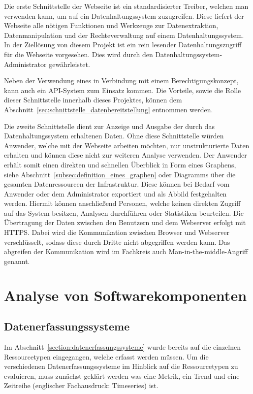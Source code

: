 Die erste Schnittstelle der Webseite ist ein standardisierter \gls{Treiber},
welchen man verwenden kann, um auf ein Datenhaltungssystem zuzugreifen. Diese
liefert der Webseite alle nötigen Funktionen und Werkzeuge zur
Datenextraktion, Datenmanipulation und der Rechteverwaltung auf einem
Datenhaltungssystem. In der Ziellösung von diesem Projekt ist ein rein lesender
Datenhaltungszugriff für die Webseite vorgesehen. Dies wird durch den
Datenhaltungssystem\hyp{}Administrator gewährleistet.

Neben der Verwendung eines  in Verbindung mit einem
Berechtigungskonzept, kann auch ein \gls{API}\hyp{}System zum Einsatz kommen.
Die Vorteile, sowie die Rolle dieser Schnittstelle innerhalb dieses Projektes,
können dem Abschnitt~\ref{sec:schnittstelle_datenbereitstellung} entnommen
werden.

Die zweite Schnittstelle dient zur Anzeige und Ausgabe der durch das
Datenhaltungssystem erhaltenen Daten. Ohne diese Schnittstelle würden Anwender,
welche mit der Webseite arbeiten möchten, nur unstrukturierte Daten
erhalten und können diese nicht zur weiteren Analyse verwenden. Der Anwender
erhält somit einen direkten und schnellen Überblick in Form eines Graphens,
siehe Abschnitt~\ref{subsec:definition_eines_graphen} oder
Diagramms über die gesamten Datenressourcen der Infrastruktur. Diese können bei
Bedarf vom Anwender oder dem Administrator exportiert und als Abbild
festgehalten werden. Hiermit können anschließend Personen, welche keinen
direkten Zugriff auf das System besitzen, Analysen durchführen oder Statistiken
beurteilen. Die Übertragung der Daten zwischen den Benutzern und dem Webserver
erfolgt mit \gls{HTTPS}. Dabei wird die Kommunikation zwischen Browser und
Webserver verschlüsselt, sodass diese durch Dritte nicht abgegriffen werden
kann. Das abgreifen der Kommunikation wird im Fachkreis auch
Man\hyp{}in\hyp{}the\hyp{}middle\hyp{}Angriff genannt.
\mr%

\chapter{Analyse von Softwarekomponenten}
\section{Datenerfassungssysteme}
Im Abschnitt~\ref{section:datenerfassungssysteme} wurde bereits auf die
einzelnen Ressourcetypen eingegangen, welche erfasst werden müssen. Um die
verschiedenen Datenerfassungssysteme im Hinblick auf die Ressourcetypen zu
evaluieren, muss zunächst geklärt werden was eine Metrik, ein Trend und eine
Zeitreihe (englischer Fachausdruck: Timeseries) ist.
\tm%

